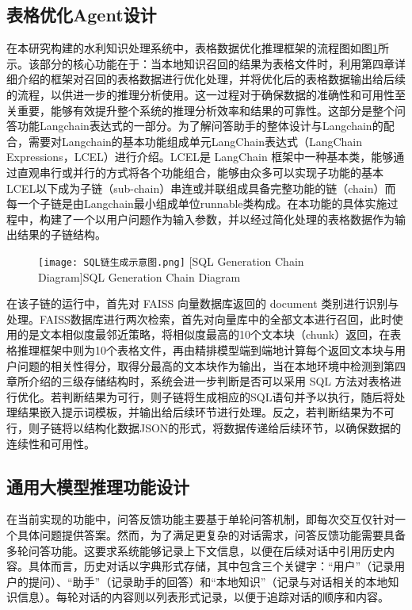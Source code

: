 \subsection{表格优化Agent设计}
在本研究构建的水利知识处理系统中，表格数据优化推理框架的流程图如图\ref{fig:SQL生成链}所示。该部分的核心功能在于：当本地知识召回的结果为表格文件时，利用第四章详细介绍的框架对召回的表格数据进行优化处理，并将优化后的表格数据输出给后续的流程，以供进一步的推理分析使用。这一过程对于确保数据的准确性和可用性至关重要，能够有效提升整个系统的推理分析效率和结果的可靠性。这部分是整个问答功能Langchain表达式的一部分。为了解问答助手的整体设计与Langchain的配合，需要对Langchain的基本功能组成单元LangChain表达式（LangChain Expressions，LCEL）进行介绍。LCEL是 LangChain 框架中一种基本类，能够通过直观串行或并行的方式将各个功能组合，能够由众多可以实现子功能的基本LCEL以下成为子链（sub-chain）串连或并联组成具备完整功能的链（chain）而每一个子链是由Langchain最小组成单位runnable类构成。在本功能的具体实施过程中，构建了一个以用户问题作为输入参数，并以经过简化处理的表格数据作为输出结果的子链结构。
\begin{figure}[!htb]
    \centering
    \texttt{[image: SQL链生成示意图.png]}
    [SQL Generation Chain Diagram]{SQL Generation Chain Diagram}
    \label{fig:SQL生成链}
\end{figure}

在该子链的运行中，首先对 FAISS 向量数据库返回的 document 类别进行识别与处理。FAISS数据库进行两次检索，首先对向量库中的全部文本进行召回，此时使用的是文本相似度最邻近策略，将相似度最高的10个文本块（chunk）返回，在表格推理框架中则为10个表格文件，再由精排模型端到端地计算每个返回文本块与用户问题的相关性得分，取得分最高的文本块作为输出，当在本地环境中检测到第四章所介绍的三级存储结构时，系统会进一步判断是否可以采用 SQL 方法对表格进行优化。若判断结果为可行，则子链将生成相应的SQL语句并予以执行，随后将处理结果嵌入提示词模板，并输出给后续环节进行处理。反之，若判断结果为不可行，则子链将以结构化数据JSON的形式，将数据传递给后续环节，以确保数据的连续性和可用性。
\subsection{通用大模型推理功能设计}
在当前实现的功能中，问答反馈功能主要基于单轮问答机制，即每次交互仅针对一个具体问题提供答案。然而，为了满足更复杂的对话需求，问答反馈功能需要具备多轮问答功能。这要求系统能够记录上下文信息，以便在后续对话中引用历史内容。具体而言，历史对话以字典形式存储，其中包含三个关键字：“用户”（记录用户的提问）、“助手”（记录助手的回答）和“本地知识”（记录与对话相关的本地知识信息）。每轮对话的内容则以列表形式记录，以便于追踪对话的顺序和内容。

